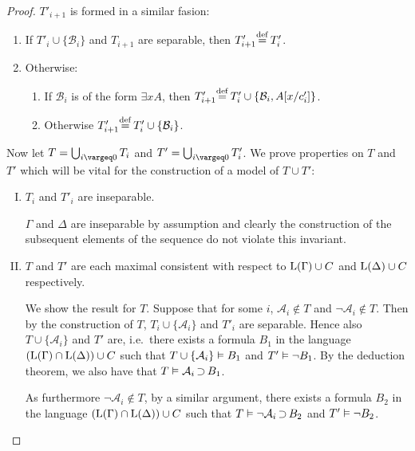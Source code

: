\begin{proof}
	$T'_{i+1}$ is formed in a similar fasion:
	\begin{enumerate}[(1$'$)]
		\item
			If $T'_{i} \cup \{\mathcal{B}_i\}$ and $T_{i+1}$ are separable, then $T'_{i+1} \defeq{}\, T'_i$.
		\item
			\begin{samepage}
				Otherwise: 
			\begin{enumerate}[(2$'$a)]
				\item If $\mathcal{B}_i$ is of the form $\exists x A$, then $T'_{i+1} \defeq{}\, T'_i \cup \{ \mathcal{B}_i, A\subst{x/c'_i} \}$.
				\item Otherwise $T'_{i+1} \defeq{}\, T'_i \cup \{ \mathcal{B}_i \}$.
			\end{enumerate}
			\end{samepage}
	\end{enumerate}

	Now let
	$T = \bigcup_{i\vargeq 0} T_i$
	and
	$T' = \bigcup_{i\vargeq 0} T'_i$.
	We prove properties on $T$ and $T'$ which will be vital for the construction of a model of $T\cup T'$:

	\begin{enumerate}[I.]
		\item
			\label{enum:theories_insep}
			$T_i$ and $T'_i$ are inseparable.

			$\Gamma$ and $\Delta$ are inseparable by assumption and clearly the construction of the subsequent elements of the sequence do not violate this invariant.


		\item
			\label{enum:each_max_consistent}
			$T$ and $T'$ are each maximal consistent with respect to $\operatorname{L}(\Gamma) \cup C$ and $\operatorname{L}(\Delta) \cup C$ respectively.

			We show the result for $T$.
			Suppose that for some $i$, $\mathcal{A}_i \not\in T$ and $\lnot\mathcal{A}_i \not\in T$.
			Then by the construction of $T$,
			$T_i \cup \{\mathcal{A}_i\}$ and $T'_i$ are separable.
			Hence also
			$T \cup \{\mathcal{A}_i\}$ and $T'$ are, i.e.\ there exists a formula $B_1$ in the language $(\operatorname{L}(\Gamma) \cap \operatorname{L}(\Delta)) \cup C$ such that
			$T \cup \{\mathcal{A}_i\} \vDash B_1$ and $T' \vDash \lnot B_1$.
			By the deduction theorem, we also have that \markA{} $T \vDash \mathcal{A}_i \operatorname{\supset} B_1$.

			As furthermore $\lnot \mathcal{A}_i \not\in T$, by a similar argument, there exists a formula $B_2$ in the language  $(\operatorname{L}(\Gamma) \cap \operatorname{L}(\Delta)) \cup C$ such that 
			\markB{} $T \vDash \lnot \mathcal{A}_i \operatorname{\supset} B_2$ and $T' \vDash \lnot B_2$.


\end{enumerate}
\end{proof}
